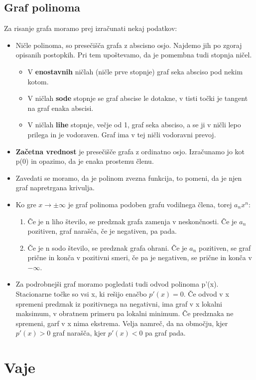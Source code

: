 \subsection{Graf polinoma}
Za risanje grafa moramo prej izračunati nekaj podatkov:
\begin{itemize}
\item Ničle polinoma, so presečišča grafa z abscisno osjo. Najdemo jih po zgoraj opisanih postopkih. Pri tem upoštevamo, da je pomembna tudi stopnja ničel. 
\begin{itemize}
\item V \textbf{enostavnih} ničlah (ničle prve stopnje) graf seka absciso pod nekim kotom.
\item V ničlah \textbf{sode} stopnje se graf abscise le dotakne, v tisti točki je tangent na graf enaka abscisi.
\item V ničlah \textbf{lihe} stopnje, večje od 1, graf seka absciso, a se ji v ničli lepo prilega in je vodoraven. Graf ima v tej ničli vodoravni prevoj.
\end{itemize}
\item \textbf{Začetna vrednost} je presečišče grafa z ordinatno osjo. Izračunamo jo kot p(0) in opazimo, da je enaka prostemu členu.
\item Zavedati se moramo, da je polinom zvezna funkcija, to pomeni, da je njen graf napretrgana krivulja. 
\item Ko gre $x\to \pm \infty$  je graf polinoma podoben grafu vodilnega člena, torej $a_nx^n$:
\begin{enumerate}
\item Če je n liho število, se predznak grafa zamenja v neskončnosti. Če je $a_ n$ pozitiven, graf narašča, če je negativen, pa pada.
\item Če je n sodo število, se predznak grafa ohrani. Če je $a_ n$ pozitiven, se graf prične in konča v pozitivni smeri, če pa je negativen, se prične in konča v $-\infty$.
\end{enumerate}
\item Za podrobnejši graf moramo pogledati tudi odvod polinoma p'(x). Stacionarne točke so vsi x, ki rešijo enačbo $p'(x)=0$. Če odvod v x spremeni predznak iz pozitivnega na negativni, ima graf v x lokalni maksimum, v obratnem primeru pa lokalni minimum. Če predznaka ne spremeni, garf v x nima ekstrema. Velja namreč, da na območju, kjer $p'(x) >0$ graf narašča, kjer $p'(x)<0$ pa graf pada.
\end{itemize}


\section{Vaje}
\label{sec:polinomi-funkcije-vaje}

